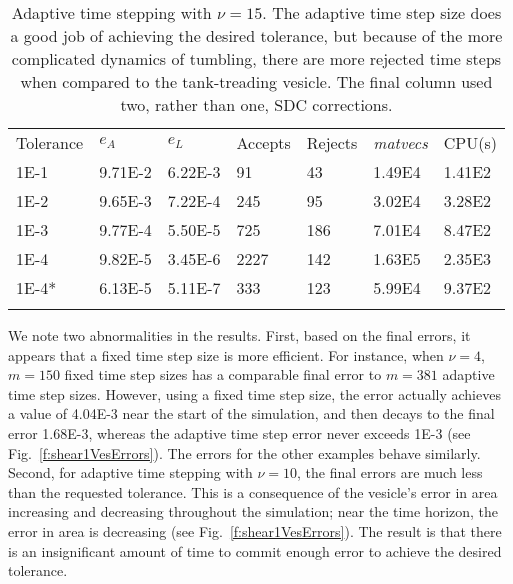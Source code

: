 \documentclass[3p,times,procedia]{elsarticle}
\begin{document}
\begin{table}[h]
\caption{\label{t:shear_nu15_sdc1}Adaptive time stepping with $\nu =
15$.  The adaptive time step size does a good job of achieving the
desired tolerance, but because of the more complicated dynamics of
tumbling, there are more rejected time steps when compared to the
tank-treading vesicle.  The final column used two, rather than one, SDC
corrections.}
\begin{tabular*}{\hsize}{@{\extracolsep{\fill}}lllllll@{}}
\toprule
Tolerance & $e_{A}$ & $e_{L}$ & Accepts & Rejects & {\em matvecs} &
CPU(s) \\
\colrule
1E-1  & 9.71E-2 & 6.22E-3 & 91   & 43  & 1.49E4 & 1.41E2 \\
1E-2  & 9.65E-3 & 7.22E-4 & 245  & 95  & 3.02E4 & 3.28E2 \\
1E-3  & 9.77E-4 & 5.50E-5 & 725  & 186 & 7.01E4 & 8.47E2 \\
1E-4  & 9.82E-5 & 3.45E-6 & 2227 & 142 & 1.63E5 & 2.35E3 \\
1E-4* & 6.13E-5 & 5.11E-7 & 333  & 123 & 5.99E4 & 9.37E2 \\
\botrule
\end{tabular*}
\end{table}

We note two abnormalities in the results.  First, based on the final
errors, it appears that a fixed time step size is more efficient.  For
instance, when $\nu=4$, $m=150$ fixed time step sizes has a comparable
final error to $m=381$ adaptive time step sizes.  However, using a
fixed time step size, the error actually achieves a value of 4.04E-3
near the start of the simulation, and then decays to the final error
1.68E-3, whereas the adaptive time step error never exceeds 1E-3 (see
Fig.~\ref{f:shear1VesErrors}).  The errors for the other examples
behave similarly.  Second, for adaptive time stepping with $\nu=10$,
the final errors are much less than the requested tolerance.  This is a
consequence of the vesicle's error in area increasing and decreasing
throughout the simulation; near the time horizon, the error in area is
decreasing (see Fig.~\ref{f:shear1VesErrors}).  The result is that
there is an insignificant amount of time to commit enough error to
achieve the desired tolerance.
\end{document}
